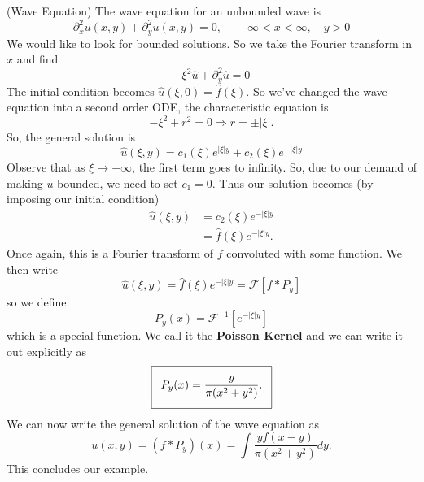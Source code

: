 \begin{ex}{(Wave Equation)}
The wave equation for an unbounded wave is
\begin{equation}
\partial_{x}^{2}u(x,y) + \partial_{y}^{2}u(x,y) = 0,\quad
-\infty<x<\infty,\quad y>0
\end{equation}
We would like to look for bounded solutions. So we take the
Fourier transform in $x$ and find
\begin{equation}
-\xi^2\widehat{u}+\partial_{y}^{2}\widehat{u} = 0
\end{equation}
The initial condition becomes
$\widehat{u}(\xi,0)=\widehat{f}(\xi)$. So we've changed the
wave equation into a second order ODE, the characteristic
equation is
\begin{equation}
-\xi^2 + r^2 = 0\Rightarrow r=\pm|\xi|.
\end{equation}
So, the general solution is
\begin{equation}
\widehat{u}(\xi,y) = c_{1}(\xi)e^{|\xi|y} + c_{2}(\xi)e^{-|\xi|y}
\end{equation}
Observe that as $\xi\to\pm\infty$, the first term goes to
infinity. So, due to our demand of making $u$ bounded, we
need to set $c_1=0$. Thus our solution becomes (by imposing
our initial condition)
\begin{subequations}
\begin{align}
\widehat{u}(\xi,y) &= c_{2}(\xi)e^{-|\xi|y}\\
&= \widehat{f}(\xi)e^{-|\xi|y}.
\end{align}
\end{subequations}
Once again, this is a Fourier transform of $f$ convoluted
with some function. We then write
\begin{equation}
\widehat{u}(\xi,y) = \widehat{f}(\xi)e^{-|\xi|y} = \mathcal{F}[f*P_y]
\end{equation}
so we define
\begin{equation}
P_{y}(x) = \mathcal{F}^{-1}[e^{-|\xi|y}]
\end{equation}
which is a special function. We call it the \textbf{Poisson Kernel}
and we can write it out explicitly as
\begin{equation}
  \addtolength{\fboxsep}{5pt}
   \boxed{
   \begin{gathered}
     P_{y}(x) = \frac{y}{\pi(x^2+y^2)}.
   \end{gathered}
   }
\end{equation}
We can now write the general solution of the wave equation
as
\begin{equation}
u(x,y) = (f*P_y)(x) = \int\frac{yf(x-y)}{\pi(x^2+y^2)}dy.
\end{equation}
This concludes our example.
\end{ex}

